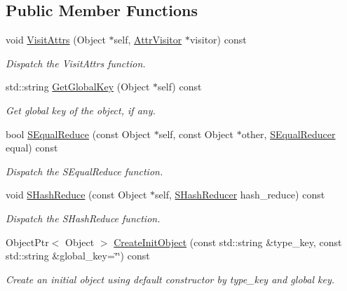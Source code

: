 \subsection*{Public Member Functions}
\begin{DoxyCompactItemize}
\item 
void \hyperlink{classtvm_1_1ReflectionVTable_a1a04983862e782c79b2d228a1e9158b9}{Visit\+Attrs} (Object $\ast$self, \hyperlink{classtvm_1_1AttrVisitor}{Attr\+Visitor} $\ast$visitor) const 
\begin{DoxyCompactList}\small\item\em Dispatch the Visit\+Attrs function. \end{DoxyCompactList}\item 
std\+::string \hyperlink{classtvm_1_1ReflectionVTable_ad91a5ee664b778c8d77ca0a5ebb209f8}{Get\+Global\+Key} (Object $\ast$self) const 
\begin{DoxyCompactList}\small\item\em Get global key of the object, if any. \end{DoxyCompactList}\item 
bool \hyperlink{classtvm_1_1ReflectionVTable_afca5e5c3d8d86bff3fb9503481727074}{S\+Equal\+Reduce} (const Object $\ast$self, const Object $\ast$other, \hyperlink{classtvm_1_1SEqualReducer}{S\+Equal\+Reducer} equal) const 
\begin{DoxyCompactList}\small\item\em Dispatch the S\+Equal\+Reduce function. \end{DoxyCompactList}\item 
void \hyperlink{classtvm_1_1ReflectionVTable_a8598da5b2df50186cbc4a66ffd539c23}{S\+Hash\+Reduce} (const Object $\ast$self, \hyperlink{classtvm_1_1SHashReducer}{S\+Hash\+Reducer} hash\+\_\+reduce) const 
\begin{DoxyCompactList}\small\item\em Dispatch the S\+Hash\+Reduce function. \end{DoxyCompactList}\item 
Object\+Ptr$<$ Object $>$ \hyperlink{classtvm_1_1ReflectionVTable_ab77d3b63f51e8596a67da6aa8cdd48ec}{Create\+Init\+Object} (const std\+::string \&type\+\_\+key, const std\+::string \&global\+\_\+key=\char`\"{}\char`\"{}) const 
\begin{DoxyCompactList}\small\item\em Create an initial object using default constructor by type\+\_\+key and global key. \end{DoxyCompactList}\item 

\end{DoxyCompactItemize}
